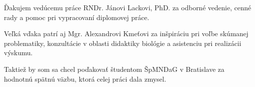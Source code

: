 Ďakujem vedúcemu práce RNDr. Jánovi Lackovi, PhD. za odborné vedenie, cenné rady a pomoc pri vypracovaní diplomovej práce. 

Veľká vďaka patrí aj Mgr. Alexandrovi Kmeťovi za inšpiráciu pri voľbe skúmanej problematiky, konzultácie v oblasti didaktiky biológie a asistenciu pri realizácii výskumu. 

Taktiež by som sa chcel poďakovať študentom ŠpMNDaG v Bratislave za hodnotnú spätnú väzbu, ktorá celej práci dala zmysel.